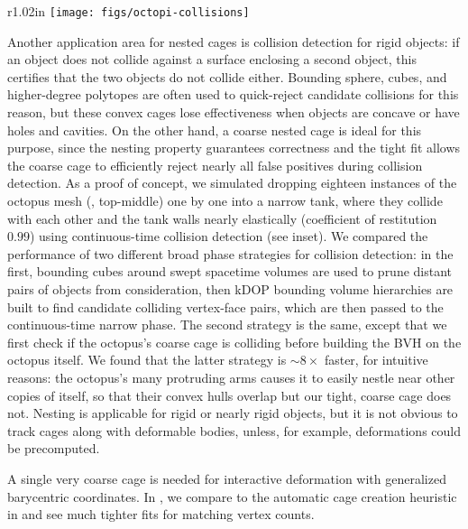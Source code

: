 %
\begin{wrapfigure}{r}{1.02in}
%
\centering
%
\texttt{[image: figs/octopi-collisions]}
%
\end{wrapfigure}
%
Another application area for nested cages is collision detection for rigid
objects: if an object does not collide against a surface enclosing a second
object, 
this certifies that the two objects do not collide either.
%
Bounding sphere, cubes, and
higher-degree polytopes are often used to quick-reject candidate collisions for
this reason, but these convex cages lose effectiveness when objects are concave
or have holes and cavities. On the other hand, a coarse nested cage is ideal
for this purpose, since the nesting property guarantees correctness and the
tight fit allows the coarse cage to efficiently reject nearly all false
positives during collision detection. As a proof of concept, we simulated
dropping eighteen instances of the octopus mesh (,
top-middle) one by one into a narrow tank, where they collide with each other
and the tank walls nearly elastically (coefficient of restitution $0.99$) using
continuous-time collision detection (see inset). We compared the performance of
two different broad phase strategies for collision detection: in the first,
bounding cubes around swept spacetime volumes are used to prune distant pairs
of objects from consideration, then kDOP bounding volume hierarchies are built
to find candidate colliding vertex-face pairs, which are then passed to the
continuous-time narrow phase. The second strategy is the same, except
that we first check if the octopus's coarse cage is colliding before building
the BVH on the octopus itself. We found that the latter strategy is 
$\sim 8\times$ faster, for intuitive reasons: the octopus's many
protruding arms causes it to easily nestle near other copies of itself, so that
their convex hulls overlap but our tight, coarse cage does not.
%
Nesting is applicable for rigid or nearly rigid objects, but it is not obvious
to track cages along with deformable bodies, unless, for example, deformations
could be precomputed.

A single very coarse cage is needed for interactive deformation with
generalized barycentric coordinates.
%
In , we compare to the automatic cage creation
heuristic in \cite{Ben-Chen:2009:SDT} and see much tighter fits for matching
vertex counts.

